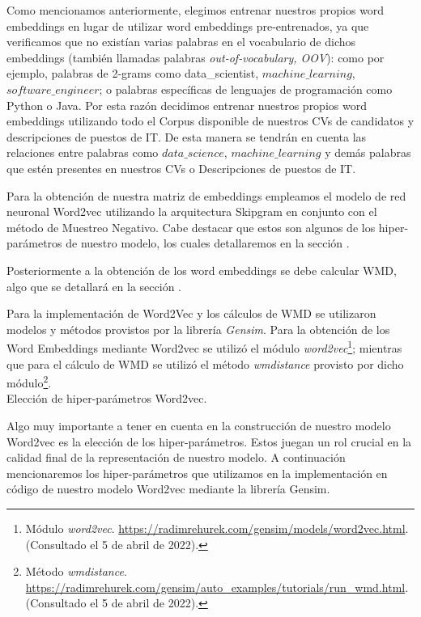 \documentclass[12pt,a4paper]{article}
\makeatletter
\renewcommand\paragraph{\@startsection{paragraph}{4}{\z@}
            {-2.5ex\@plus -1ex \@minus -.25ex}
            {1.25ex \@plus .25ex}
            {\normalfont\normalsize\bfseries}}
\makeatother
\begin{document}
\begin{sloppypar}
Como mencionamos anteriormente, elegimos entrenar nuestros propios word embeddings en lugar de utilizar word embeddings pre-entrenados, ya que verificamos que no existían varias palabras en el vocabulario de dichos embeddings (también llamadas palabras \textit{out-of-vocabulary, OOV}): como por ejemplo, palabras de 2-grams como data\_scientist, $machine\_learning$, $software\_engineer$; o palabras específicas de lenguajes de programación como Python o Java. Por esta razón decidimos entrenar nuestros propios word embeddings utilizando todo el Corpus disponible de nuestros CVs de candidatos y descripciones de puestos de IT. De esta manera se tendrán en cuenta las relaciones entre palabras como $data\_science$, $machine\_learning$ y demás palabras que estén presentes en nuestros CVs o Descripciones de puestos de IT.

Para la obtención de nuestra matriz de embeddings empleamos el modelo de red neuronal Word2vec utilizando la arquitectura Skipgram en conjunto con el método de Muestreo Negativo. Cabe destacar que estos son algunos de los hiper-parámetros de nuestro modelo, los cuales detallaremos en la sección \textit{}.

Posteriormente a la obtención de los word embeddings se debe calcular WMD, algo que se detallará en la sección \textit{}.

Para la implementación de Word2Vec y los cálculos de WMD se utilizaron modelos y métodos provistos por la librería \textit{Gensim}. Para la obtención de los Word Embeddings mediante Word2vec se utilizó el módulo \textit{word2vec}\footnote{Módulo \textit{word2vec}. \url{https://radimrehurek.com/gensim/models/word2vec.html}. (Consultado el 5 de abril de 2022).}; mientras que para el cálculo de WMD se utilizó el método \textit{wmdistance} provisto por dicho módulo\footnote{Método \textit{wmdistance}. \url{https://radimrehurek.com/gensim/auto_examples/tutorials/run_wmd.html}. (Consultado el 5 de abril de 2022).}.
\\

\paragraph{Elección de hiper-parámetros Word2vec.}\label{hiper_par_word2vec}

Algo muy importante a tener en cuenta en la construcción de nuestro modelo Word2vec es la elección de los hiper-parámetros\cite{NLP_26}. Estos juegan un rol crucial en la calidad final de la representación de nuestro modelo. A continuación mencionaremos los hiper-parámetros que utilizamos en la implementación en código de nuestro modelo Word2vec mediante la librería Gensim.


\end{sloppypar}
\end{document}
